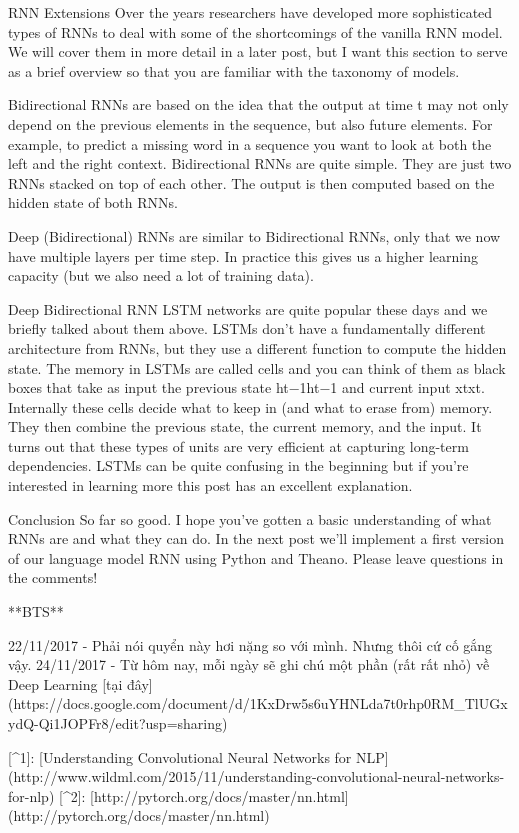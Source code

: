 RNN Extensions
Over the years researchers have developed more sophisticated types of RNNs to deal with some of the shortcomings of the vanilla RNN model. We will cover them in more detail in a later post, but I want this section to serve as a brief overview so that you are familiar with the taxonomy of models.

Bidirectional RNNs are based on the idea that the output at time t may not only depend on the previous elements in the sequence, but also future elements. For example, to predict a missing word in a sequence you want to look at both the left and the right context. Bidirectional RNNs are quite simple. They are just two RNNs stacked on top of each other. The output is then computed based on the hidden state of both RNNs.

Deep (Bidirectional) RNNs are similar to Bidirectional RNNs, only that we now have multiple layers per time step. In practice this gives us a higher learning capacity (but we also need a lot of training data).

Deep Bidirectional RNN LSTM networks are quite popular these days and we briefly talked about them above. LSTMs don’t have a fundamentally different architecture from RNNs, but they use a different function to compute the hidden state. The memory in LSTMs are called cells and you can think of them as black boxes that take as input the previous state ht−1ht−1 and current input xtxt. Internally these cells decide what to keep in (and what to erase from) memory. They then combine the previous state, the current memory, and the input. It turns out that these types of units are very efficient at capturing long-term dependencies. LSTMs can be quite confusing in the beginning but if you’re interested in learning more this post has an excellent explanation.

Conclusion
So far so good. I hope you’ve gotten a basic understanding of what RNNs are and what they can do. In the next post we’ll implement a first version of our language model RNN using Python and Theano. Please leave questions in the comments!

**BTS**

22/11/2017 - Phải nói quyển này hơi nặng so với mình. Nhưng thôi cứ cố gắng vậy.
24/11/2017 - Từ hôm nay, mỗi ngày sẽ ghi chú một phần (rất rất nhỏ) về Deep Learning [tại đây](https://docs.google.com/document/d/1KxDrw5s6uYHNLda7t0rhp0RM_TlUGxydQ-Qi1JOPFr8/edit?usp=sharing)

[^1]: [Understanding Convolutional Neural Networks for NLP](http://www.wildml.com/2015/11/understanding-convolutional-neural-networks-for-nlp)
[^2]: [http://pytorch.org/docs/master/nn.html](http://pytorch.org/docs/master/nn.html)